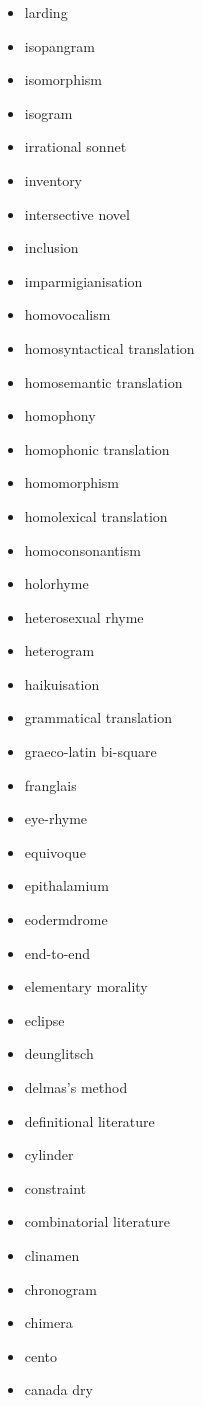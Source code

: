 \begin{multicols}{3}
\begin{itemize}
  \item larding
  \item isopangram
  \item isomorphism
  \item isogram
  \item irrational sonnet
  \item inventory
  \item intersective novel
  \item inclusion
  \item imparmigianisation
  \item homovocalism
  \item homosyntactical translation
  \item homosemantic translation
  \item homophony
  \item homophonic translation
  \item homomorphism
  \item homolexical translation
  \item homoconsonantism
  \item holorhyme
  \item heterosexual rhyme
  \item heterogram
  \item haikuisation
  \item grammatical translation
  \item graeco-latin bi-square
  \item franglais
  \item eye-rhyme
  \item equivoque
  \item epithalamium
  \item eodermdrome
  \item end-to-end
  \item elementary morality
  \item eclipse
  \item deunglitsch
  \item delmas's method
  \item definitional literature
  \item cylinder
  \item constraint
  \item combinatorial literature
  \item clinamen
  \item chronogram
  \item chimera
  \item cento
  \item canada dry

\end{itemize}
\end{multicols}

